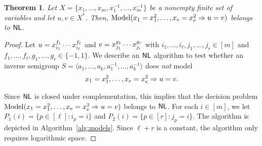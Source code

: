 \documentclass{amsart}
\newcommand{\Model}{\mathrm{Model}}
\newcommand{\eq}{\ensuremath\mathrel{=}}
\newcommand{\NL}{\ensuremath\mathsf{NL}}
\newtheorem{theorem}{Theorem}[section]
\theoremstyle{remark}
\numberwithin{equation}{section}
\begin{document}
\begin{theorem}
  Let $X = \{x_1, \dots, x_m,x_1^{-1},\dots,x_m^{-1}\}$ be a nonempty finite set of variables and let $u, v \in X^*$. Then, $\Model(x_1 \eq x_1^2,\dots,x_e \eq x_e^2 \Rightarrow u \eq v)$ belongs to $\NL$.
  \label{thm:model}
\end{theorem}
%
\begin{proof}
  Let $u \eq x_{i_1}^{f_1} \cdots x_{i_\ell}^{f_\ell}$ and $v \eq x_{j_1}^{g_1} \cdots x_{j_r}^{g_r}$ with $i_1,\dots,i_\ell,j_1,\dots,j_r \in [m]$ and $f_1,\dots,f_\ell,g_1,\dots,g_r \in \{-1,1\}$. We describe an $\NL$ algorithm to test whether an inverse semigroup $S = \langle a_1, \dots, a_k,a_1^{-1},\dots,a_k^{-1} \rangle$ does \emph{not} model
  \begin{align*}
    x_1 \eq x_1^2,\dots,x_e \eq x_e^2 \Rightarrow u \eq v.
  \end{align*}
  
  Since $\NL$ is closed under complementation, this implies that the decision problem $\Model(x_1 \eq x_1^2,\dots,x_e \eq x_e^2 \Rightarrow u \eq v)$ belongs to $\NL$.
  For each $i \in [m]$, we let $P_1(i) = \{p \in [\ell]:i_p = i\}$ and $P_2(i) = \{p \in [r]:j_p = i\}$.
  The algorithm is depicted in Algorithm~\ref{alg:models}.
  Since $\ell + r$ is a constant, the algorithm only requires logarithmic
  space.


\end{proof}
\end{document}
